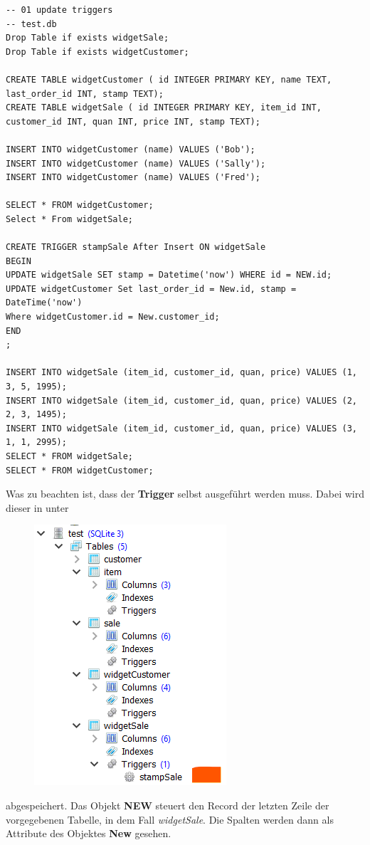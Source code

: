 \begin{lstlisting}[style=SQL]
-- 01 update triggers
-- test.db
Drop Table if exists widgetSale;
Drop Table if exists widgetCustomer;

CREATE TABLE widgetCustomer ( id INTEGER PRIMARY KEY, name TEXT, last_order_id INT, stamp TEXT);
CREATE TABLE widgetSale ( id INTEGER PRIMARY KEY, item_id INT, customer_id INT, quan INT, price INT, stamp TEXT);

INSERT INTO widgetCustomer (name) VALUES ('Bob');
INSERT INTO widgetCustomer (name) VALUES ('Sally');
INSERT INTO widgetCustomer (name) VALUES ('Fred');

SELECT * FROM widgetCustomer;
Select * From widgetSale;

CREATE TRIGGER stampSale After Insert ON widgetSale
BEGIN
UPDATE widgetSale SET stamp = Datetime('now') WHERE id = NEW.id;
UPDATE widgetCustomer Set last_order_id = New.id, stamp = DateTime('now')
Where widgetCustomer.id = New.customer_id;
END
;

INSERT INTO widgetSale (item_id, customer_id, quan, price) VALUES (1, 3, 5, 1995);
INSERT INTO widgetSale (item_id, customer_id, quan, price) VALUES (2, 2, 3, 1495);
INSERT INTO widgetSale (item_id, customer_id, quan, price) VALUES (3, 1, 1, 2995);
SELECT * FROM widgetSale;
SELECT * FROM widgetCustomer;
\end{lstlisting}
Was zu beachten ist, dass der \textbf{Trigger} selbst ausgeführt werden muss. Dabei wird dieser in unter 
\begin{figure}[H]
	\centering
	\includegraphics[scale = 0.6]{attachment/chapter_3/Scc065}
	\caption{}
	\label{fig:Scc065}
\end{figure}
abgespeichert.
Das Objekt \textbf{NEW} steuert den Record der letzten Zeile der vorgegebenen Tabelle, in dem Fall \textit{widgetSale}.
Die Spalten werden dann als Attribute des Objektes \textbf{New} gesehen.

